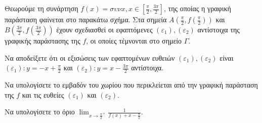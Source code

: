 Θεωρούμε τη συνάρτηση $f(x) = \sigma\upsilon\nu x, x \in \left[\frac{\pi}{2}, \frac{3\pi}{2}\right]$, της οποίας η γραφική παράσταση φαίνεται στο παρακάτω σχήμα. Στα σημεία $A\left(\frac{\pi}{2}, f\left(\frac{\pi}{2}\right)\right)$ και $B\left(\frac{3\pi}{2}, f\left(\frac{3\pi}{2}\right)\right)$ έχουν σχεδιασθεί οι εφαπτόμενες $(\varepsilon_1), (\varepsilon_2)$ αντίστοιχα της γραφικής παράστασης της $f$, οι οποίες τέμνονται στο σημείο $\Gamma$.

\begin{alist}
\item Να αποδείξετε ότι οι εξισώσεις των εφαπτομένων ευθειών $(\varepsilon_1), (\varepsilon_2)$ είναι $(\varepsilon_1): y = -x + \frac{\pi}{2}$ και $(\varepsilon_2): y = x - \frac{3\pi}{2}$ αντίστοιχα. 
\item Να υπολογίσετε το εμβαδόν του χωρίου που περικλείεται από την γραφική παράσταση της $f$ και τις ευθείες $(\varepsilon_1)$ και $(\varepsilon_2)$. 
\item Να υπολογίσετε το όριο $\lim_{x \to \frac{\pi}{2}^+} \frac{1}{f(x)+x-\frac{\pi}{2}}$. 
\end{alist}